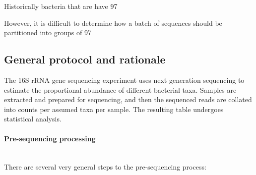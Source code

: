 Historically bacteria that are have 97%

However, it is difficult to determine how a batch of sequences should be partitioned into groups of 97%

\subsection{General protocol and rationale}
The 16S rRNA gene sequencing experiment uses next generation sequencing to estimate the proportional abundance of different bacterial taxa. Samples are extracted and prepared for sequencing, and then the sequenced reads are collated into counts per assumed taxa per sample. The resulting table undergoes statistical analysis.

\paragraph{Pre-sequencing processing}\mbox{}\\
There are several very general steps to the pre-sequencing process:

